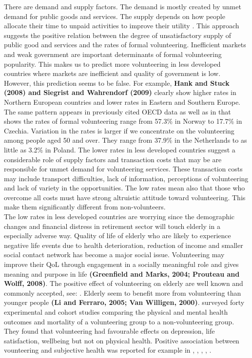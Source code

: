 \documentclass[10pt, letterpaper]{article}
\begin{document}
\begin{spacing}{1.4}
There are demand and supply factors. The demand is mostly created by unmet demand for public goods and services. The supply depends on how people allocate their time to unpaid activities to improve their utility \citep{ziemek06}. This approach  suggests the positive relation between the degree of unsatisfactory supply of public good and services and the rates of formal volunteering. Inefficient markets and weak government are important determinants of formal volunteering popularity. This makes us to predict more volunteering in less developed countries where markets are inefficient and quality of government is low. However, this prediction seems to be false. For example, \textbf{Hank and Stuck (2008) and Siegrist and Wahrendorf (2009)}  clearly show higher rates in Northern European countries and lower rates in Eastern and Southern Europe. The same pattern appears in previously cited OECD data \citep{Oecd16} as well as in  \citet{Oecd15} that shows the rates of formal volunteering range from 57.3\% in Norway to 17.7\% in Czechia. Variation in the rates is larger if we concentrate on the volunteering among people aged 50 and over. They range from 37.9\% in the Netherlands to as little as 3.2\% in Poland. The lower rates in less developed countries suggest a considerable role of supply factors and transaction costs that may be are responsible for unmet demand for volunteering services. These transaction costs may include transport difficulties, lack of information, perceptions of volunteering and lack of variety in the opportunities. The low rates mean also that those who overcome all costs must have strong altruistic attitude toward volunteering. This make them significantly different from non-volunteers.  \\

The low rates in less developed countries are worrying since the demographic changes and financial distress in retirement sector  will touch elderly in a especially adverse way. Quality of life of elderly who are likely to experience negative life events due to health deterioration, reduction of income and smaller social contact network has become a major social issue. Volunteering may improve their QoL through engagement in a socially meaningful role and  gives meaning and purpose in life \textbf{(Greenfield and Marks, 2004; Prouteau and Wolff, 2008)}. The positive effect of volunteering on elderly are well known and commonly accepted, see:  \citet{morrow10}. Elderly seem to benefit more from volunteering than younger people \textbf{(Li and Ferraro, 2005; Van Willigen, 2000)}. \citet{jenkinson2013volunteering} surveyed forty experimental and cohort studies comparing the physical and mental health outcomes and mortality of a volunteering group to a non-volunteering group. They found that volunteering had favourable effects on depression, life satisfaction, wellbeing but not on physical health. Positive association between vounteering and subjective health was reported for example in  \citet{borgonovi08}, \cite{anderson14}, \cite{li06}, \cite{VanWilligen00}, \citet{detollenaere17}. \\ 


\end{spacing}
\end{document}

